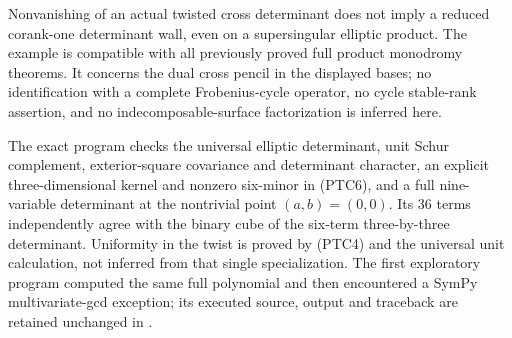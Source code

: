 \begin{remark}
\label{rem:ss-product-one-axis-cross-cube-scope}
Nonvanishing of an actual twisted cross determinant does not imply
a reduced corank-one determinant wall, even on a supersingular
elliptic product. The example is compatible with all previously
proved full product monodromy theorems. It concerns the dual cross
pencil in the displayed bases; no identification with a complete
Frobenius-cycle operator, no cycle stable-rank assertion, and no
indecomposable-surface factorization is inferred here.

The exact program
checks the universal elliptic determinant, unit Schur complement,
exterior-square covariance and determinant character, an explicit
three-dimensional kernel and nonzero six-minor in (PTC6), and a
full nine-variable determinant at the nontrivial point \((a,b)=(0,0)\).
Its 36 terms independently agree with the binary cube of the
six-term three-by-three determinant. Uniformity in the twist is
proved by (PTC4) and the universal unit calculation, not inferred
from that single specialization. The first exploratory program
computed the same full polynomial and then encountered a SymPy
multivariate-gcd exception; its executed source, output and traceback
are retained unchanged in
.
\end{remark}
